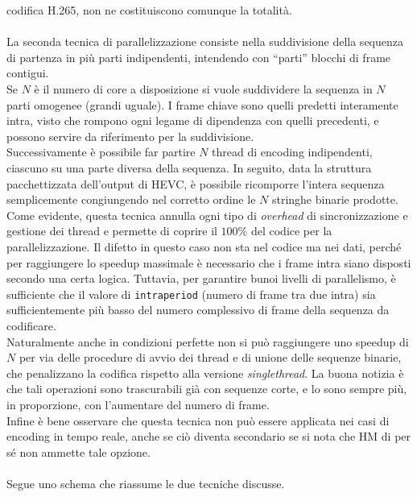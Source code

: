 codifica H.265, non ne costituiscono comunque la totalità.
\\ \\
La seconda tecnica di parallelizzazione consiste nella 
suddivisione della sequenza di partenza in più parti indipendenti, intendendo 
con ``parti'' blocchi di frame contigui.\\
Se $N$ è il numero di core a disposizione 
si vuole suddividere la sequenza in $N$ parti omogenee (grandi uguale). I frame 
chiave sono quelli predetti interamente intra, visto che rompono ogni 
legame di dipendenza con quelli precedenti, e possono servire da riferimento 
per la suddivisione.\\
Successivamente è possibile far partire $N$ thread di encoding 
indipendenti, ciascuno su una parte diversa della sequenza. In seguito, data la 
struttura 
pacchettizzata dell'output di HEVC, è possibile ricomporre l'intera 
sequenza semplicemente congiungendo nel corretto ordine le $N$ stringhe binarie 
prodotte. \\
Come evidente, questa tecnica annulla ogni tipo di \emph{overhead} di 
sincronizzazione e gestione dei thread e permette di coprire il $100\%$ del 
codice per la parallelizzazione. Il difetto in questo caso non sta nel codice 
ma nei dati, perché per raggiungere lo speedup massimale è necessario che i 
frame intra siano disposti secondo una certa logica. Tuttavia, per garantire 
bunoi livelli di parallelismo, è sufficiente che il valore di 
\verb|intraperiod| (numero di frame tra due intra) sia sufficientemente più 
basso del numero complessivo di frame della sequenza da codificare. \\
Naturalmente anche in condizioni perfette non si può raggiungere uno speedup di 
$N$ per via delle procedure di avvio dei thread e di
unione delle sequenze binarie, che penalizzano la codifica 
rispetto alla versione \emph{singlethread}. La buona 
notizia è che tali operazioni sono trascurabili già con sequenze corte, e lo 
sono sempre più, in proporzione, con l'aumentare del numero di frame.\\
Infine è bene osservare che questa tecnica non può essere applicata 
nei casi di encoding in tempo reale, anche se ciò diventa secondario se si nota 
che HM di per sé non ammette tale opzione.
\\ \\
Segue uno schema che riassume le due tecniche discusse.

